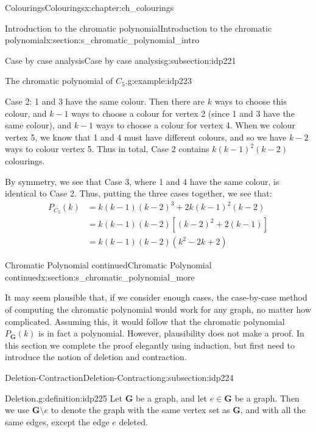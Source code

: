 \documentclass[oneside,10pt,]{book}
\numberwithin{equation}{section}
\newcommand{\bfG}{\mathbf{G}}
\newcommand{\amp}{&}
\begin{document}
\begin{chapterptx}{Colourings}{}{Colourings}{}{}{x:chapter:ch_colourings}
\begin{sectionptx}{Introduction to the chromatic polynomial}{}{Introduction to the chromatic polynomial}{}{}{x:section:s_chromatic_polynomial_intro}
\begin{subsectionptx}{Case by case analysis}{}{Case by case analysis}{}{}{g:subsection:idp221}
\begin{example}{The chromatic polynomial of \(C_5\).}{g:example:idp223}
\par
Case 2: 1 and 3 have the same colour. Then there are \(k\) ways to choose this colour, and \(k-1\) ways to choose a colour for vertex 2 (since 1 and 3 have the same colour), and \(k-1\) ways to choose a colour for vertex 4.  When we colour vertex 5, we know that 1 and 4 must have different colours, and so we have \(k-2\) ways to colour vertex 5.  Thus in total, Case 2 contains \(k(k-1)^2(k-2)\) colourings.%
\par
By symmetry, we see that Case 3, where 1 and 4 have the same colour, is identical to Case 2.  Thus, putting the three cases together, we see that:%
%
\begin{align*}
P_{C_5}(k)\amp=k(k-1)(k-2)^3+2k(k-1)^2(k-2)\\
\amp=k(k-1)(k-2)[(k-2)^2+2(k-1)]\\
\amp=k(k-1)(k-2)(k^2-2k+2)
\end{align*}
\end{example}
\end{subsectionptx}
\end{sectionptx}
%
%
\typeout{************************************************}
\typeout{************************************************}
%
\begin{sectionptx}{Chromatic Polynomial continued}{}{Chromatic Polynomial continued}{}{}{x:section:s_chromatic_polynomial_more}
\begin{introduction}{}%
It may seem plausible that, if we consider enough cases, the case-by-case method of computing the chromatic polynomial would work for any graph, no matter how complicated.  Assuming this, it would follow that the chromatic polynomial \(P_\bfG(k)\) is in fact a polynomial.  However, plausibility does not make a proof.  In this section we complete the proof elegantly using induction, but first need to introduce the notion of deletion and contraction.%
\end{introduction}%
%
%
\typeout{************************************************}
\typeout{************************************************}
%
\begin{subsectionptx}{Deletion-Contraction}{}{Deletion-Contraction}{}{}{g:subsection:idp224}
\begin{definition}{Deletion.}{g:definition:idp225}%
Let \(\bfG\) be a graph, and let \(e\in\bfG\) be a graph.  Then we use \(\bfG\setminus e\) to denote the graph with the same vertex set as \(\bfG\), and with all the same edges, except the edge \(e\) deleted.%

\end{definition}
\end{subsectionptx}
\end{sectionptx}
\end{chapterptx}
\end{document}
